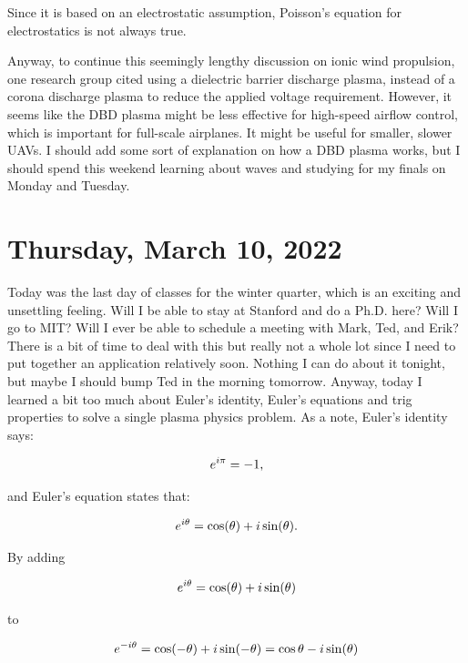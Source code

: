 \documentclass[12pt]{article}
\begin{document}
Since it is based on an electrostatic assumption, Poisson's equation for electrostatics is not always true. 

\par
Anyway, to continue this seemingly lengthy discussion on ionic wind propulsion, one research group cited using a dielectric barrier discharge plasma, instead of a corona discharge plasma to reduce the applied voltage requirement. However, it seems like the DBD plasma might be less effective for high-speed airflow control, which is important for full-scale airplanes.  It might be useful for smaller, slower UAVs. I should add some sort of explanation on how a DBD plasma works, but I should spend this weekend learning about waves and studying for my finals on Monday and Tuesday. 

\section{Thursday, March 10, 2022}

\par
Today was the last day of classes for the winter quarter, which is an exciting and unsettling feeling. Will I be able to stay at Stanford and do a Ph.D. here? Will I go to MIT? Will I ever be able to schedule a meeting with Mark, Ted, and Erik? There is a bit of time to deal with this but really not a whole lot since I need to put together an application relatively soon. Nothing I can do about it tonight, but maybe I should bump Ted in the morning tomorrow. Anyway, today I learned a bit too much about Euler's identity, Euler's equations and trig properties to solve a single plasma physics problem.  As a note, Euler's identity says:

\begin{equation}
\centering
e^{i\pi} = -1, 
\end{equation}

and Euler's equation states that:

\begin{equation}
\centering
e^{i\theta} = \cos(\theta) + i \sin(\theta).
\end{equation}

By adding 

\begin{equation}
\centering
e^{i\theta} = \cos(\theta) + i \sin(\theta)
\end{equation} 

to 

\begin{equation}
\centering
e^{-i\theta} = \cos(-\theta) + i \sin(-\theta) = \cos{\theta} - i\sin(\theta)
\end{equation}
\end{document}
